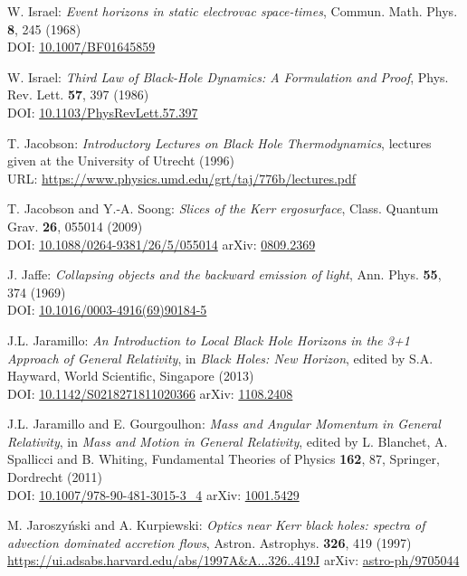 \begin{thebibliography}{123}
W. Israel: {\em Event horizons in static electrovac space-times},
Commun. Math. Phys. {\bf 8}, 245 (1968)\\
DOI: \href{https://doi.org/10.1007/BF01645859}{10.1007/BF01645859}

W. Israel: {\em Third Law of Black-Hole Dynamics: A Formulation and Proof},
Phys. Rev. Lett. {\bf 57}, 397 (1986)\\
DOI: \href{https://doi.org/10.1103/PhysRevLett.57.397}{10.1103/PhysRevLett.57.397}

T. Jacobson:
{\em Introductory Lectures on Black Hole Thermodynamics},
lectures given at the University of Utrecht (1996)\\
URL: \url{https://www.physics.umd.edu/grt/taj/776b/lectures.pdf}

T. Jacobson and Y.-A. Soong:
{\em Slices of the Kerr ergosurface},
Class. Quantum Grav. {\bf 26}, 055014 (2009)\\
DOI: \href{https://doi.org/10.1088/0264-9381/26/5/055014}{10.1088/0264-9381/26/5/055014}\hfill
arXiv: \href{https://arxiv.org/abs/0809.2369}{0809.2369}

J. Jaffe:
{\em Collapsing objects and the backward emission of light},
Ann. Phys. {\bf 55}, 374 (1969)\\
DOI: \href{https://doi.org/10.1016/0003-4916(69)90184-5}{10.1016/0003-4916(69)90184-5}

J.L. Jaramillo: {\em An Introduction to Local Black Hole Horizons in the 3+1
Approach of General Relativity}, in {\em Black Holes: New Horizon}, edited
by S.A. Hayward, World Scientific, Singapore (2013)\\
DOI: \href{https://doi.org/10.1142/S0218271811020366}{10.1142/S0218271811020366}\hfill
arXiv: \href{https://arxiv.org/abs/1108.2408}{1108.2408}

J.L. Jaramillo and E. Gourgoulhon:
{\em Mass and Angular Momentum in General Relativity},
in \emph{Mass and Motion in General Relativity}, edited by L. Blanchet, A. Spallicci and B. Whiting, Fundamental Theories of Physics {\bf 162}, 87,
Springer, Dordrecht (2011) \\
DOI: \href{https://doi.org/10.1007/978-90-481-3015-3_4}{10.1007/978-90-481-3015-3\_4}\hfill
arXiv: \href{https://arxiv.org/abs/1001.5429}{1001.5429}

M. Jaroszy\'nski and A. Kurpiewski:
{\em Optics near Kerr black holes: spectra of advection dominated accretion flows},
Astron. Astrophys. {\bf 326}, 419 (1997)\\
\url{https://ui.adsabs.harvard.edu/abs/1997A&A...326..419J}\hfill
arXiv: \href{https://arxiv.org/abs/astro-ph/9705044}{astro-ph/9705044}


\end{thebibliography}
